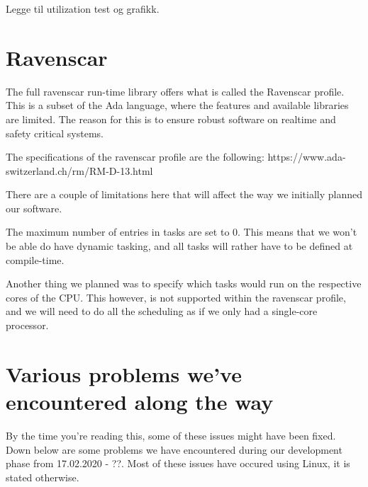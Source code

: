 \documentclass{article}
\begin{document}
Legge til utilization test og grafikk.

\section{Ravenscar}

The full ravenscar run-time library offers what is called the Ravenscar profile. This is a subset of the Ada language, where the features and available libraries are limited. The reason for this is to ensure robust software on realtime and safety critical systems. 

The specifications of the ravenscar profile are the following:
https://www.ada-switzerland.ch/rm/RM-D-13.html

There are a couple of limitations here that will affect the way we initially planned our software. 

The maximum number of entries in tasks are set to 0. This means that we won't be able do have dynamic tasking, and all tasks will rather have to be defined at compile-time. 

Another thing we planned was to specify which tasks would run on the respective cores of the CPU. This however, is not supported within the ravenscar profile, and we will need to do all the scheduling as if we only had a single-core processor. 

\section{Various problems we've encountered along the way}

By the time you're reading this, some of these issues might have been fixed. Down below are some problems we have encountered during our development phase from 17.02.2020 - ??. Most of these issues have occured using Linux, it is stated otherwise.
\end{document}
